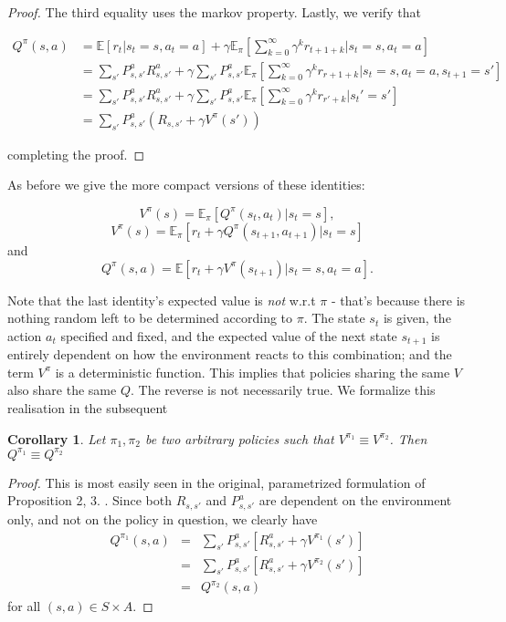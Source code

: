 \documentclass[11pt]{article} %
\newtheorem{cor}{Corollary}
\begin{document}
\begin{proof}
	The third equality uses the markov property. Lastly, we verify that

	\[
		\begin{array}{rl}
			Q^{\pi}(s,a)  	& = \mathbb{E}[r_t | s_t = s, a_t = a] + \gamma \mathbb{E}_{\pi}[\sum_{k=0}^{\infty} \gamma^k r_{t+1+k} | s_t = s, a_t = a] \\
						& = \sum_{s'} P_{s,s'}^a R_{s,s'}^a + \gamma \sum_{s'} P_{s,s'}^a \mathbb{E}_{\pi}[\sum_{k=0}^{\infty} \gamma^k r_{r+1+k} | s_t = s, a_t = a, s_{t+1} = s'] \\
						& = \sum_{s'} P_{s,s'}^a R_{s,s'}^a + \gamma \sum_{s'} P_{s,s'}^a \mathbb{E}_{\pi}[\sum_{k=0}^{\infty} \gamma^k r_{r'+k} | s_t' = s'] \\
						& = \sum_{s'} P_{s,s'}^a ( R_{s,s'} + \gamma V^{\pi}(s') )
		\end{array}
	\]

	completing the proof.

\end{proof}

As before we give the more compact versions of these identities:

$$ V^{\pi}(s) =  \mathbb{E}_{\pi}[Q^{\pi}(s_{t},a_{t}) | s_t = s ], $$
$$ V^{\pi}(s) =  \mathbb{E}_{\pi}[r_t + \gamma Q^{\pi}(s_{t+1},a_{t+1}) | s_t = s ] $$ and 
$$ Q^{\pi}(s,a) = \mathbb{E}[r_t + \gamma V^{\pi}(s_{t+1}) | s_t = s, a_t = a]. $$

Note that the last identity's expected value is \textit{not} w.r.t $\pi$ - that's because there is nothing random left to be determined according to $\pi$. The state $s_t$ is given, the action $a_t$ specified and fixed, and the expected value of the next state $s_{t+1}$ is entirely dependent on how the environment reacts to this combination; and the term $V^{\pi}$ is a deterministic function. This implies that policies sharing the same $V$ also share the same $Q$. The reverse is not necessarily true. We formalize this realisation in the subsequent

\begin{cor}
	Let $\pi_1,\pi_2$ be two arbitrary policies such that $V^{\pi_1} \equiv V^{\pi_2}$. Then $Q^{\pi_1} \equiv Q^{\pi_2}$
\end{cor}

\begin{proof}
	This is most easily seen in the original, parametrized formulation of Proposition 2, 3. . Since both $R_{s,s'}$ and $P_{s,s'}^a$ are dependent on the environment only, and not on the policy in question, we clearly have
	\[
		\begin{array}{rll}
			Q^{\pi_1}(s,a) & = &  \sum_{s'} P_{s,s'}^a [ R_{s,s'}^a + \gamma V^{\pi_1}(s') ] \\
						& = & \sum_{s'} P_{s,s'}^a [ R_{s,s'}^a + \gamma V^{\pi_2}(s') ] \\
						& = & Q^{\pi_2}(s,a)
		\end{array}
	\]
	for all $(s,a) \in S \times A$.
\end{proof}
\end{document}
